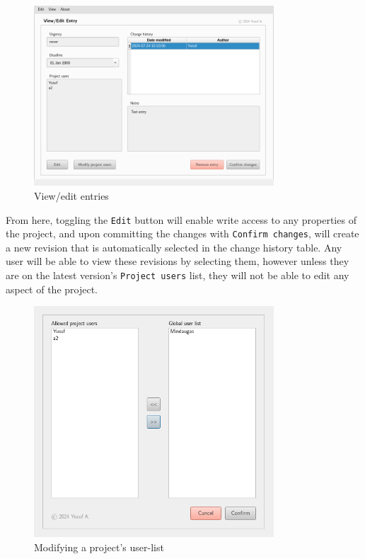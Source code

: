 \documentclass{report}
\begin{document}
	\begin{figure}[h]
		\centering
		\includegraphics[width=0.8\textwidth]{edit-entry}
		\caption{View/edit entries}
		\label{fig:edit-entry}
	\end{figure}
	
	From here, toggling the \verb|Edit| button will enable write access to any properties of the project, and upon
	committing the changes with \verb|Confirm changes|, will create a new revision that is automatically selected
	in the change history table. Any user will be able to view these revisions by selecting them, however unless
	they are on the latest version's \verb|Project users| list, they will not be able to edit any aspect of the project.

	\begin{figure}[h]
		\centering
		\includegraphics[width=0.8\textwidth]{modify-users}
		\caption{Modifying a project's user-list}
		\label{fig:modify-users}
	\end{figure}
	
\end{document}
